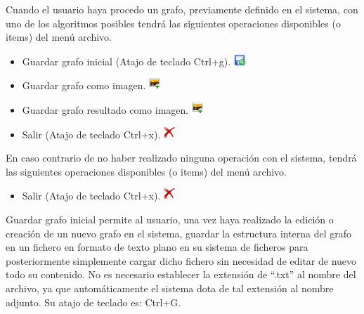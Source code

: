 Cuando el usuario haya procedo un grafo, previamente definido en el sistema, con uno de los algoritmos posibles tendrá las siguientes operaciones disponibles (o items) del menú archivo.

\begin{itemize}
\item Guardar grafo inicial (Atajo de teclado Ctrl+g). \quad \includegraphics[scale=.9]{./imagenes_documentacion/guardar.png} 
\item Guardar grafo como imagen. \quad \includegraphics[scale=.15]{./imagenes_documentacion/guardar_imagen.png}
\item Guardar grafo resultado como imagen. \quad \includegraphics[scale=.15]{./imagenes_documentacion/guardar_imagen.png}
\item Salir (Atajo de teclado Ctrl+x). \quad \includegraphics[scale=.9]{./imagenes_documentacion/exit.png}
\end{itemize}

En caso contrario de no haber realizado ninguna operación con el sistema, tendrá las siguientes operaciones disponibles (o items) del menú archivo.

\begin{itemize}
\item Salir (Atajo de teclado Ctrl+x). \quad \includegraphics[scale=.9]{./imagenes_documentacion/exit.png}
\end{itemize}

Guardar grafo inicial permite al usuario, una vez haya realizado la edición o creación de un nuevo grafo en el sistema, guardar la estructura interna del grafo en un fichero en formato de texto plano en su sistema de ficheros para posteriormente simplemente cargar dicho fichero sin necesidad de editar de nuevo todo su contenido. No es necesario establecer la extensión de ``.txt'' al nombre del archivo, ya que automáticamente el sistema dota de tal extensión al nombre adjunto. Su atajo de teclado es: Ctrl+G. \\

